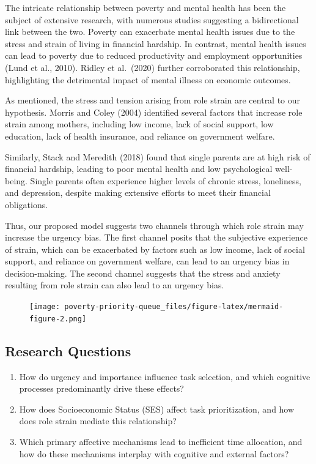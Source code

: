 \documentclass[
]{article}
\begin{document}
The intricate relationship between poverty and mental health has been
the subject of extensive research, with numerous studies suggesting a
bidirectional link between the two. Poverty can exacerbate mental health
issues due to the stress and strain of living in financial hardship. In
contrast, mental health issues can lead to poverty due to reduced
productivity and employment opportunities (Lund et al., 2010). Ridley et
al.~(2020) further corroborated this relationship, highlighting the
detrimental impact of mental illness on economic outcomes.

As mentioned, the stress and tension arising from role strain are
central to our hypothesis. Morris and Coley (2004) identified several
factors that increase role strain among mothers, including low income,
lack of social support, low education, lack of health insurance, and
reliance on government welfare.

Similarly, Stack and Meredith (2018) found that single parents are at
high risk of financial hardship, leading to poor mental health and low
psychological well-being. Single parents often experience higher levels
of chronic stress, loneliness, and depression, despite making extensive
efforts to meet their financial obligations.

Thus, our proposed model suggests two channels through which role strain
may increase the urgency bias. The first channel posits that the
subjective experience of strain, which can be exacerbated by factors
such as low income, lack of social support, and reliance on government
welfare, can lead to an urgency bias in decision-making. The second
channel suggests that the stress and anxiety resulting from role strain
can also lead to an urgency bias.

\begin{figure}[H]

{\centering \texttt{[image: poverty-priority-queue\_files/figure-latex/mermaid-figure-2.png]}

}

\end{figure}

\hypertarget{research-questions}{%
\subsection{Research Questions}\label{research-questions}}

\begin{enumerate}
\def\labelenumi{\arabic{enumi}.}
\item
  How do urgency and importance influence task selection, and which
  cognitive processes predominantly drive these effects?
\item
  How does Socioeconomic Status (SES) affect task prioritization, and
  how does role strain mediate this relationship?
\item
  Which primary affective mechanisms lead to inefficient time
  allocation, and how do these mechanisms interplay with cognitive and
  external factors?
\end{enumerate}
\end{document}

